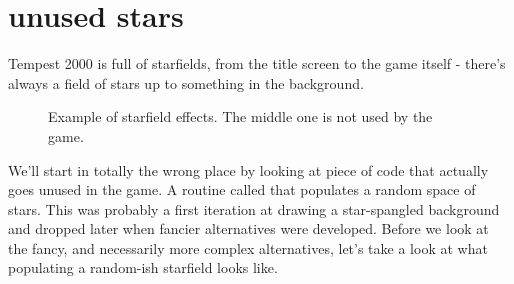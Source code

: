 \chapter{unused stars}
\label{sec:listing}
\lstset{style=68KStyle}

Tempest 2000 is full of starfields, from the title screen to the game itself - there's always a field of stars up to something in the background.

\begin{figure}[H]
    \centering
    \begin{adjustbox}{width=12cm,center}
      \hspace{0.5cm}
      \hspace{0.5cm}
    \end{adjustbox}
  \caption{Example of starfield effects. The middle one is not used by the game.}
\end{figure}

We'll start in totally the wrong place by looking at piece of code that actually goes unused in the game. A routine called
 that populates a random space of stars. This was probably a first iteration at drawing a star-spangled
background and dropped later when fancier alternatives were developed. Before we look at the fancy, and necessarily more complex
alternatives, let's take a look at what populating a random-ish starfield looks like.

